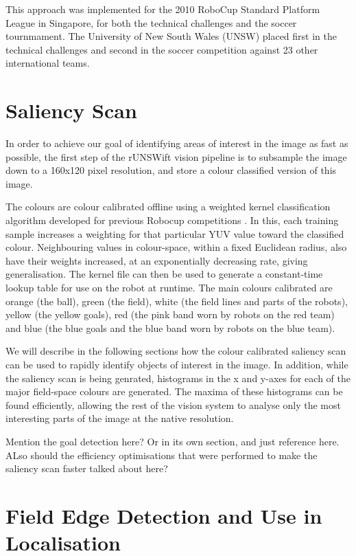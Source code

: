\documentclass[runningheads,a4paper]{llncs}
\begin{document}
This approach was implemented for the 2010 RoboCup Standard Platform League in Singapore, for both the technical challenges and the soccer tournmament. The University of New South Wales (UNSW) placed first in the technical challenges and second in the soccer competition against 23 other international teams.

\section{Saliency Scan}

In order to achieve our goal of identifying areas of interest in the image as fast as possible, the first step of the rUNSWift vision pipeline is to subsample the image down to a 160x120 pixel resolution, and store a colour classified version of this image.

The colours are colour calibrated offline using a weighted kernel classification algorithm developed for previous Robocup competitions \cite{kimcuongpham}. In this, each training sample increases a weighting for that particular YUV value toward the classified colour. Neighbouring values in colour-space, within a fixed Euclidean radius, also have their weights increased, at an exponentially decreasing rate, giving generalisation. The kernel file can then be used to generate a constant-time lookup table for use on the robot at runtime. The main colours calibrated are orange (the ball), green (the field), white (the field lines and parts of the robots), yellow (the yellow goals), red (the pink band worn by robots on the red team) and blue (the blue goals and the blue band worn by robots on the blue team).

We will describe in the following sections how the colour calibrated saliency scan can be used to rapidly identify objects of interest in the image. In addition, while the saliency scan is being genrated, histograms in the x and y-axes for each of the major field-space colours are generated. The maxima of these histograms can be found efficiently, allowing the rest of the vision system to analyse only the most interesting parts of the image at the native resolution.

Mention the goal detection here? Or in its own section, and just reference here. ALso should the efficiency optimisations that were performed to make the saliency scan faster talked about here?

\section{Field Edge Detection and Use in Localisation}
\end{document}
